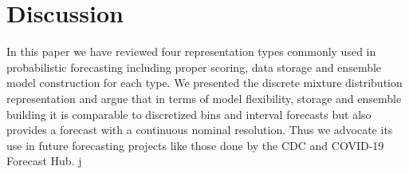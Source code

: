 \documentclass{article}\usepackage[]{graphicx}\usepackage[]{color}
\begin{document}
\section{Discussion}

In this paper we have reviewed four representation types commonly used in
probabilistic 
forecasting including proper scoring, data storage and ensemble model 
construction for each type. We presented the discrete mixture distribution
representation and argue that in terms of model flexibility, storage and 
ensemble building it is
comparable to discretized bins and interval forecasts but also provides a 
forecast with a continuous nominal resolution. Thus we advocate its use in
future forecasting projects like those done by the CDC and COVID-19 Forecast 
Hub.
j


\end{document}
